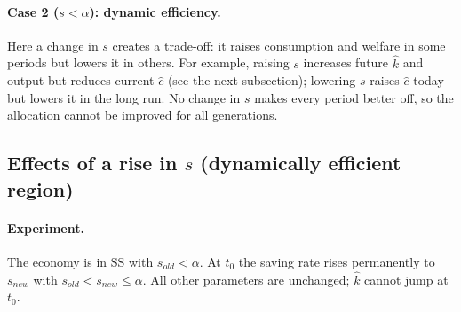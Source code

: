 \paragraph{Case 2 ($s<\alpha$): dynamic efficiency.} Here a change in $s$ creates a trade-off: it raises consumption and welfare in some periods but lowers it in others. For example, raising $s$ increases future $\hat k$ and output but reduces current $\hat c$ (see the next subsection); lowering $s$ raises $\hat c$ today but lowers it in the long run. No change in $s$ makes every period better off, so the allocation cannot be improved for all generations.

\subsection{Effects of a rise in \texorpdfstring{$s$}{s} (dynamically efficient region) }

\paragraph{Experiment.} The economy is in SS with $s_{old}<\alpha$. At $t_0$ the saving rate rises permanently to $s_{new}$ with $s_{old}<s_{new}\le\alpha$. All other parameters are unchanged; $\hat k$ cannot jump at $t_0$.

